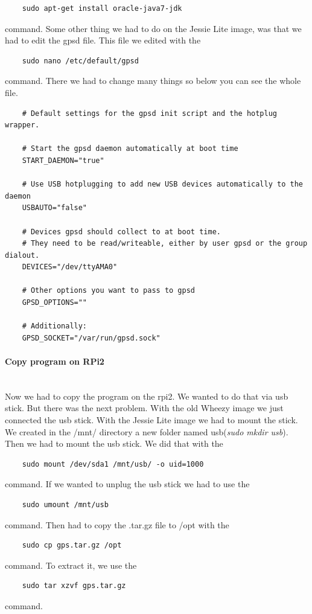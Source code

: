\begin{verbatim}
	sudo apt-get install oracle-java7-jdk
\end{verbatim}
command.\newline
Some other thing we had to do on the Jessie Lite image, was that we had to edit the \gls{gpsd} file. This file we edited with the 
\begin{verbatim}
	sudo nano /etc/default/gpsd
\end{verbatim}
command.\newline
There we had to change many things so below you can see the whole file. 
\begin{verbatim}
	# Default settings for the gpsd init script and the hotplug wrapper.

	# Start the gpsd daemon automatically at boot time
	START_DAEMON="true"

	# Use USB hotplugging to add new USB devices automatically to the daemon
	USBAUTO="false"

	# Devices gpsd should collect to at boot time.
	# They need to be read/writeable, either by user gpsd or the group dialout.
	DEVICES="/dev/ttyAMA0"

	# Other options you want to pass to gpsd
	GPSD_OPTIONS=""

	# Additionally:
	GPSD_SOCKET="/var/run/gpsd.sock"
\end{verbatim}

\paragraph{Copy program on RPi2} \mbox{}\\
Now we had to copy the program on the \gls{rpi2}. We wanted to do that via \gls{usb} stick. But there was the next problem. With the old Wheezy image we just connected the \gls{usb} stick. With the Jessie Lite image we had to mount the stick. We created in the /mnt/ directory a new folder named usb(\textit{sudo mkdir usb}). Then we had to mount the \gls{usb} stick. We did that with the
\begin{verbatim}
	sudo mount /dev/sda1 /mnt/usb/ -o uid=1000
\end{verbatim}
command. If we wanted to unplug the \gls{usb} stick we had to use the 
\begin{verbatim}
	sudo umount /mnt/usb
\end{verbatim}
command.\newline
Then had to copy the .tar.gz file to /opt with the \begin{verbatim}
	sudo cp gps.tar.gz /opt
\end{verbatim}
command. To extract it, we use the 
\begin{verbatim}
	sudo tar xzvf gps.tar.gz
\end{verbatim}
command.\newline

